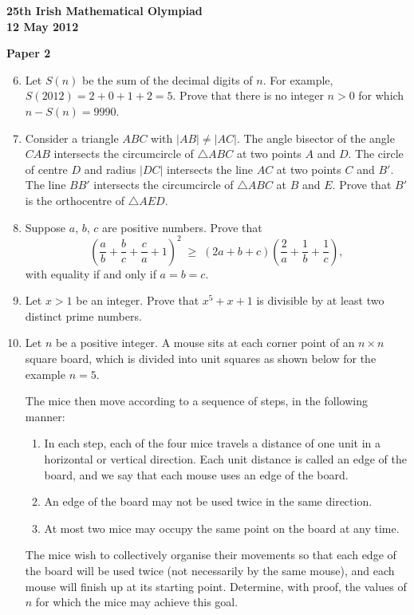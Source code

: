 \documentclass[12pt]{article}
\begin{document}
\newpage
\begin{center}
{\large\bfseries 25th Irish Mathematical Olympiad\\12 May 2012}
\end{center}
\bigskip\noindent\textbf{Paper 2}\bigskip
\begin{enumerate}
\setcounter{enumi}{5}
\item Let $S(n)$ be the sum of the decimal digits of $n$. For example, $S(2012) = 2 + 0 + 1 + 2 = 5$. Prove that there is no integer $n > 0$ for which $n - S(n) = 9990$.

\item Consider a triangle $ABC$ with $|AB| \ne |AC|$. The angle bisector of the angle $CAB$ intersects the circumcircle of $\triangle ABC$ at two points $A$ and $D$. The circle of centre $D$ and radius $|DC|$ intersects the line $AC$ at two points $C$ and $B'$. The line $BB'$ intersects the circumcircle of $\triangle ABC$ at $B$ and $E$. Prove that $B'$ is the orthocentre of $\triangle AED$.

\item Suppose $a$, $b$, $c$ are positive numbers. Prove that
\[
\left(\frac{a}{b} + \frac{b}{c} + \frac{c}{a} + 1\right)^2 \;\ge\; (2a+b+c)\left(\frac{2}{a} + \frac{1}{b} + \frac{1}{c}\right),
\]
with equality if and only if $a = b = c$.

\item Let $x > 1$ be an integer. Prove that $x^5 + x + 1$ is divisible by at least two distinct prime numbers.

\item Let $n$ be a positive integer. A mouse sits at each corner point of an $n \times n$ square board, which is divided into unit squares as shown below for the example $n = 5$.

The mice then move according to a sequence of steps, in the following manner:
\begin{enumerate}
\item In each step, each of the four mice travels a distance of one unit in a horizontal or vertical direction. Each unit distance is called an edge of the board, and we say that each mouse uses an edge of the board.
\item An edge of the board may not be used twice in the same direction.
\item At most two mice may occupy the same point on the board at any time.
\end{enumerate}
The mice wish to collectively organise their movements so that each edge of the board will be used twice (not necessarily by the same mouse), and each mouse will finish up at its starting point. Determine, with proof, the values of $n$ for which the mice may achieve this goal.
\end{enumerate}
\end{document}

